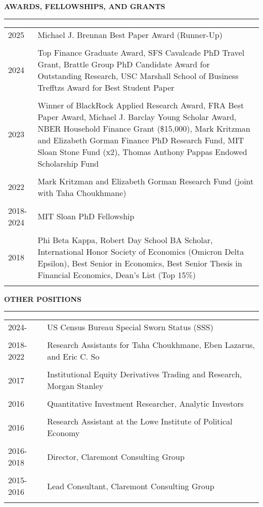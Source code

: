 \documentclass[a4paper, 10pt]{article}
\newcommand{\cvsec}[1]
{
	\needspace{2\baselineskip}
	\noindent \textbf{#1}
	
	\vspace{2pt}
	
	\hrule
	
	\bigskip
}
\newcommand{\cvitem}[2]{#1 & #2 \\ & \\}
\newenvironment{cvchrono}[1]
{
	\cvsec{#1}
	\begin{tabu} to \linewidth {X[1,l]X[6,l]} 
}
{
	\end{tabu}
}
\begin{document}
\begin{cvchrono}{AWARDS, FELLOWSHIPS, AND GRANTS}
	\cvitem{2025}{Michael J. Brennan Best Paper Award (Runner-Up)}
	\cvitem{2024}{Top Finance Graduate Award, SFS Cavalcade PhD Travel Grant, Brattle Group PhD Candidate Award for Outstanding Research, USC Marshall School of Business Trefftzs Award for Best Student Paper}
	\cvitem{2023}{Winner of BlackRock Applied Research Award, FRA Best Paper Award, Michael J. Barclay Young Scholar Award, NBER Household Finance Grant (\$15,000), Mark Kritzman and Elizabeth Gorman Finance PhD Research Fund, MIT Sloan Stone Fund (x2), Thomas Anthony Pappas Endowed Scholarship Fund}
	\cvitem{2022}{Mark Kritzman and Elizabeth Gorman Research Fund (joint with Taha Choukhmane)}
	\cvitem{2018-2024}{MIT Sloan PhD Fellowship}
	\cvitem{2018}{Phi Beta Kappa, Robert Day School BA Scholar, International Honor Society of Economics (Omicron Delta Epsilon), Best Senior in Economics, Best Senior Thesis in Financial Economics, Dean's List (Top 15\%)}
\end{cvchrono}

\begin{cvchrono}{OTHER POSITIONS}
	\cvitem{2024-}{US Census Bureau Special Sworn Status (SSS)}
	\cvitem{2018-2022}{Research Assistants for Taha Choukhmane, Eben Lazarus, and Eric C. So}
	\cvitem{2017}{Institutional Equity Derivatives Trading and Research, Morgan Stanley}
	\cvitem{2016}{Quantitative Investment Researcher, Analytic Investors}
	\cvitem{2016}{Research Assistant at the Lowe Institute of Political Economy}
	\cvitem{2016-2018}{Director, Claremont Consulting Group}
	\cvitem{2015-2016}{Lead Consultant, Claremont Consulting Group}
\end{cvchrono}
\end{document}
